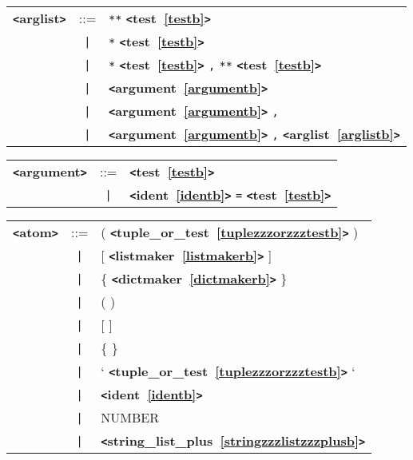 \documentclass[12pt]{article}
\begin{document}
\label{arglistb}
\begin{tabular}{lcl}
{\bf \verb+<+arglist\verb+>+} & ::=  & \verb|**| {\bf \verb+<+test~\ref{testb}\verb+>+}  \\
 & \verb+|+  & \verb|*| {\bf \verb+<+test~\ref{testb}\verb+>+}  \\
 & \verb+|+  & \verb|*| {\bf \verb+<+test~\ref{testb}\verb+>+}  \verb|,| \verb|**| {\bf \verb+<+test~\ref{testb}\verb+>+}  \\
 & \verb+|+  & {\bf \verb+<+argument~\ref{argumentb}\verb+>+}  \\
 & \verb+|+  & {\bf \verb+<+argument~\ref{argumentb}\verb+>+}  \verb|,| \\
 & \verb+|+  & {\bf \verb+<+argument~\ref{argumentb}\verb+>+}  \verb|,| {\bf \verb+<+arglist~\ref{arglistb}\verb+>+}  \\
\end{tabular}

\label{argumentb}
\begin{tabular}{lcl}
{\bf \verb+<+argument\verb+>+} & ::=  & {\bf \verb+<+test~\ref{testb}\verb+>+}  \\
 & \verb+|+  & {\bf \verb+<+ident~\ref{identb}\verb+>+}  \verb|=| {\bf \verb+<+test~\ref{testb}\verb+>+}  \\
\end{tabular}

\label{atomb}
\begin{tabular}{lcl}
{\bf \verb+<+atom\verb+>+} & ::=  & ( {\bf \verb+<+tuple\_or\_test~\ref{tuplezzzorzzztestb}\verb+>+}  ) \\
 & \verb+|+  & [ {\bf \verb+<+listmaker~\ref{listmakerb}\verb+>+}  ] \\
 & \verb+|+  & \{ {\bf \verb+<+dictmaker~\ref{dictmakerb}\verb+>+}  \} \\
 & \verb+|+  & ( ) \\
 & \verb+|+  & [ ] \\
 & \verb+|+  & \{ \} \\
 & \verb+|+  & ` {\bf \verb+<+tuple\_or\_test~\ref{tuplezzzorzzztestb}\verb+>+}  ` \\
 & \verb+|+  & {\bf \verb+<+ident~\ref{identb}\verb+>+}  \\
 & \verb+|+  & NUMBER \\
 & \verb+|+  & {\bf \verb+<+string\_list\_plus~\ref{stringzzzlistzzzplusb}\verb+>+}  \\
\end{tabular} \\
\end{document}
